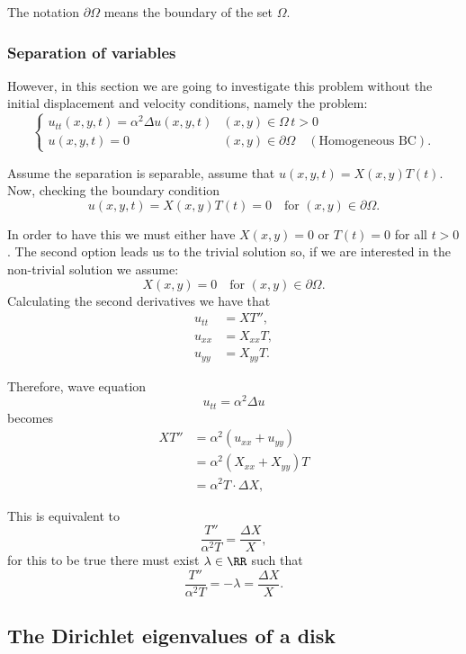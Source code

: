 \documentclass[12pt, a4paper]{article}
\begin{document}
\begin{mdremark}
    The notation \(\partial \Omega\) means the boundary of the set \(\Omega\).
\end{mdremark}

\subsubsection{Separation of variables}

However, in this section we are going to investigate this problem without the initial displacement and velocity conditions, namely the problem: 
\[\begin{cases}
    u_{tt}(x,y,t) = \alpha^2 \Delta u(x,y,t) & (x,y) \in \Omega \, t>0 \\
    u(x,y,t)=0 & (x,y) \in \partial \Omega \quad(\text{Homogeneous BC}).
\end{cases}\]

Assume the separation is separable, assume that \(u(x,y,t)=X(x,y)T(t)\). Now, checking the boundary condition 
\[u(x,y,t)= X(x,y)T(t)=0 \quad \text{for } (x,y) \in \partial \Omega.\]

In order to have this we must either have \(X(x,y)=0\) or \(T(t) =0\) for all \(t>0\). The second option leads us to the trivial solution so, if we are interested in the non-trivial solution we assume:
\[X(x,y)=0 \quad \text{for } (x,y) \in \partial \Omega.\]
Calculating the second derivatives we have that 
\[\begin{aligned}
    u_{tt} &= XT'', \\
    u_{xx} &= X_{xx}T, \\
    u_{yy} &= X_{yy}T.
\end{aligned}\]

Therefore, wave equation 
\[u_{tt} = \alpha^2 \Delta u \] 
becomes 
\[\begin{aligned}
    XT'' &= \alpha^2 (u_{xx}+u_{yy}) \\
    &=\alpha^2 \left( X_{xx} +X_{yy} \right)T \\
    &= \alpha^2 T \cdot \Delta X,
\end{aligned}\]

This is equivalent to 
\[\frac{T''}{\alpha^2 T} = \frac{\Delta X}{X},\]
for this to be true there must exist \(\lambda \in \RR\) such that 
\[\frac{T''}{\alpha^2 T} = -\lambda = \frac{\Delta X}{X}.\]



\subsection{The Dirichlet eigenvalues of a disk}
\end{document}
